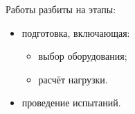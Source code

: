 Работы разбиты на этапы:
\begin{itemize}
  \item подготовка, включающая:
    \begin{itemize} %
      \item выбор оборудования;
      \item расчёт нагрузки.
    \end{itemize}
  \item проведение испытаний.
\end{itemize}
